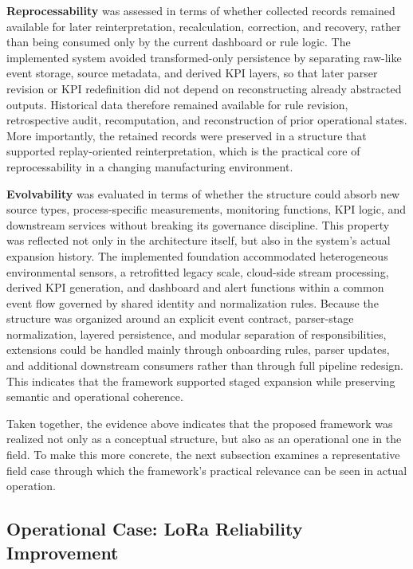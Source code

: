 \documentclass[systems,article,submit,pdftex,moreauthors]{Definitions/mdpi}
\begin{document}
\textbf{Reprocessability} was assessed in terms of whether collected records remained available for later reinterpretation, recalculation, correction, and recovery, rather than being consumed only by the current dashboard or rule logic. The implemented system avoided transformed-only persistence by separating raw-like event storage, source metadata, and derived KPI layers, so that later parser revision or KPI redefinition did not depend on reconstructing already abstracted outputs. Historical data therefore remained available for rule revision, retrospective audit, recomputation, and reconstruction of prior operational states. More importantly, the retained records were preserved in a structure that supported replay-oriented reinterpretation, which is the practical core of reprocessability in a changing manufacturing environment.

\textbf{Evolvability} was evaluated in terms of whether the structure could absorb new source types, process-specific measurements, monitoring functions, KPI logic, and downstream services without breaking its governance discipline. This property was reflected not only in the architecture itself, but also in the system's actual expansion history. The implemented foundation accommodated heterogeneous environmental sensors, a retrofitted legacy scale, cloud-side stream processing, derived KPI generation, and dashboard and alert functions within a common event flow governed by shared identity and normalization rules. Because the structure was organized around an explicit event contract, parser-stage normalization, layered persistence, and modular separation of responsibilities, extensions could be handled mainly through onboarding rules, parser updates, and additional downstream consumers rather than through full pipeline redesign. This indicates that the framework supported staged expansion while preserving semantic and operational coherence.

Taken together, the evidence above indicates that the proposed framework was realized not only as a conceptual structure, but also as an operational one in the field. To make this more concrete, the next subsection examines a representative field case through which the framework's practical relevance can be seen in actual operation.



\subsection{Operational Case: LoRa Reliability Improvement}
\label{sec:lora_reliability}
\end{document}
